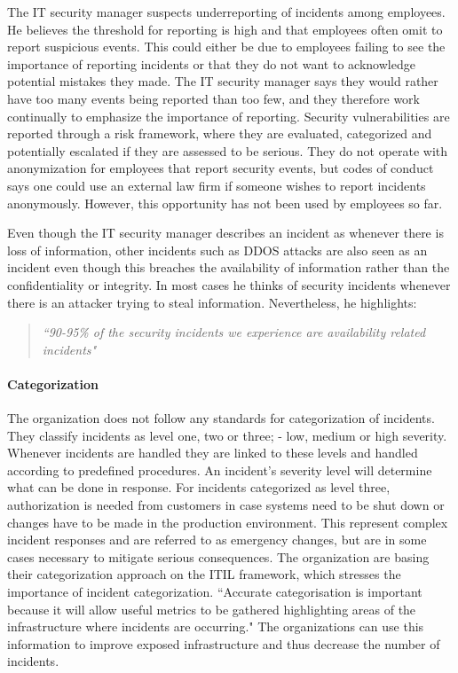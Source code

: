 The IT security manager suspects underreporting of incidents among employees. He believes the threshold for reporting is high and that employees often omit to report suspicious events. This could either be due to employees failing to see the importance of reporting incidents or that they do not want to acknowledge potential mistakes they made. The IT security manager says they would rather have too many events being reported than too few, and they therefore work continually to emphasize the importance of reporting.
Security vulnerabilities are reported through a risk framework, where they are evaluated, categorized and potentially escalated if they are assessed to be serious. They do not operate with anonymization for employees that report security events, but codes of conduct says one could use an external law firm if someone wishes to report incidents anonymously. However, this opportunity has not been used by employees so far. 

Even though the IT security manager describes an incident as whenever there is loss of information, other incidents such as DDOS attacks are also seen as an incident even though this breaches the availability of information rather than the confidentiality or integrity. In most cases he thinks of security incidents whenever there is an attacker trying to steal information. Nevertheless, he highlights:
\begin{quote}
\textit{``90-95\% of the security incidents we experience are availability related incidents"}
\end{quote}

\paragraph{Categorization}
The organization does not follow any standards for categorization of incidents. They classify incidents as level one, two or three; - low, medium or high severity. Whenever incidents are handled they are linked to these levels and handled according to predefined procedures. An incident's severity level will determine what can be done in response. For incidents categorized as level three, authorization is needed from customers in case systems need to be shut down or changes have to be made in the production environment. This represent complex incident responses and are referred to as emergency changes, but are in some cases necessary to mitigate serious consequences. 
The organization are basing their categorization approach on the ITIL framework, which stresses the importance of incident categorization. ``Accurate categorisation is important because it will allow useful metrics to be gathered highlighting areas of the infrastructure where incidents are occurring\cite{itilbok}." The organizations can use this information to improve exposed infrastructure and thus decrease the number of incidents.

